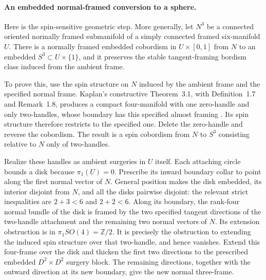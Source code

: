 \paragraph{An embedded normal-framed conversion to a sphere.}
Here is the spin-sensitive geometric step.  More generally, let
$N^3$ be a connected oriented normally framed submanifold of a
simply connected framed six-manifold $U$.  There is a normally
framed embedded cobordism in $U\times[0,1]$ from $N$ to an
embedded $S^3\subset U\times\{1\}$, and it preserves the stable
tangent-framing bordism class induced from the ambient frame.

To prove this, use the spin structure on $N$ induced by the ambient
frame and the specified normal frame.  Kaplan's constructive
Theorem~3.1, with Definition~1.7 and Remark~1.8, produces a compact
four-manifold with one zero-handle and only two-handles, whose
boundary has this specified almost framing
\cite{mapsKaplan79}.  Its spin structure therefore restricts to
the specified one.  Delete the zero-handle and reverse the
cobordism.  The result is a spin cobordism from $N$ to $S^3$
consisting relative to $N$ only of two-handles.

Realize these handles as ambient surgeries in $U$ itself.
Each attaching circle bounds a disk because $\pi_1(U)=0$.
Prescribe its inward boundary collar to point along the first
normal vector of $N$.  General position makes the disk embedded,
its interior disjoint from $N$, and all the disks pairwise
disjoint: the relevant strict inequalities are $2+3<6$ and
$2+2<6$.  Along its boundary, the rank-four normal bundle of the
disk is framed by the two specified tangent directions of the
two-handle attachment and the remaining two normal vectors of
$N$.  Its extension obstruction is in $\pi_1SO(4)=\mathbb Z/2$.
It is precisely the obstruction to extending the induced spin
structure over that two-handle, and hence vanishes.  Extend this
four-frame over the disk and thicken the first two directions to
the prescribed embedded $D^2\times D^2$ surgery block.  The
remaining directions, together with the outward direction at
its new boundary, give the new normal three-frame.

